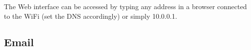 \documentclass[11pt,a4paper]{article}
\begin{document}
The Web interface can be accessed by typing any address in a browser
connected to the WiFi (set the DNS accordingly) or simply 10.0.0.1.

\subsection{Email}





\end{document}
